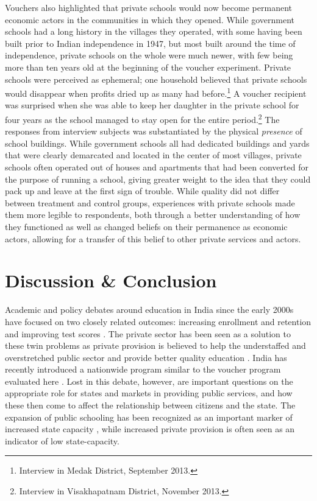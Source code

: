 \documentclass[hidelinks, 12pt, titlepage]{article}
\begin{document}
		Vouchers also highlighted that private schools would now become permanent economic actors in the communities in which they opened.  While government schools had a long history in the villages they operated, with some having been built prior to Indian independence in 1947, but most built around the time of independence, private schools on the whole were much newer, with few being more than ten years old at the beginning of the voucher experiment.  Private schools were perceived as ephemeral; one household believed that private schools would disappear when profits dried up as many had before.\footnote{Interview in Medak District, September 2013.}  A voucher recipient was surprised when she was able to keep her daughter in the private school for four years as the school managed to stay open for the entire period.\footnote{Interview in Visakhapatnam District, November 2013.}  The responses from interview subjects was substantiated by the physical \emph{presence} of school buildings.  While government schools all had dedicated buildings and yards that were clearly demarcated and located in the center of most villages, private schools often operated out of houses and apartments that had been converted for the purpose of running a school, giving greater weight to the idea that they could pack up and leave at the first sign of trouble.  While quality did not differ between treatment and control groups, experiences with private schools made them more legible to respondents, both through a better understanding of how they functioned as well as changed beliefs on their permanence as economic actors, allowing for a transfer of this belief to other private services and actors.

\section*{Discussion \& Conclusion\label{section:conclusion}}

	Academic and policy debates around education in India since the early 2000s have focused on two closely related outcomes: increasing enrollment and retention \citep{Banerji2008} and improving test scores \citep{ASER2017}.  The private sector has been seen as a solution to these twin problems as private provision is believed to help the understaffed and overstretched public sector and provide better quality education \citep{Muralidharan2015}.  India has recently introduced a nationwide program similar to the voucher program evaluated here \citep{GovernmentofIndia2009}.  Lost in this debate, however, are important questions on the appropriate role for states and markets in providing public services, and how these then come to affect the relationship between citizens and the state.  The expansion of public schooling has been recognized as an important marker of increased state capacity \citep{Mangla2015a}, while increased private provision is often seen as an indicator of low state-capacity.
\end{document}
